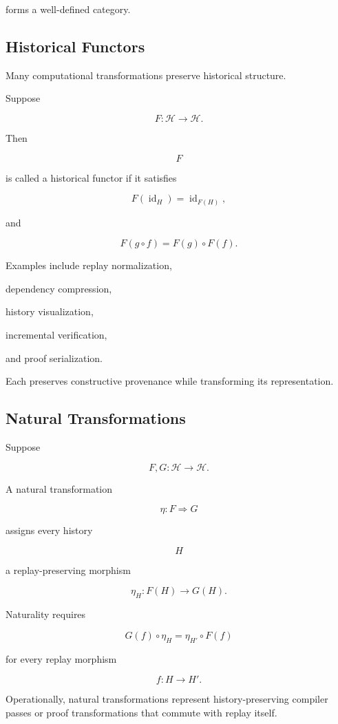 \documentclass[12pt,oneside]{article}
\theoremstyle{definition}
\theoremstyle{remark}
\begin{document}
forms a well-defined category.

\subsection{Historical Functors}

Many computational transformations preserve historical structure.

Suppose

\[
F:\mathcal H\rightarrow\mathcal H.
\]

Then

\[
F
\]

is called a historical functor if it satisfies

\[
F(\operatorname{id}_H)
=
\operatorname{id}_{F(H)},
\]

and

\[
F(g\circ f)
=
F(g)\circ F(f).
\]

Examples include replay normalization,

dependency compression,

history visualization,

incremental verification,

and proof serialization.

Each preserves constructive provenance while transforming its representation.

\subsection{Natural Transformations}

Suppose

\[
F,G
:
\mathcal H
\rightarrow
\mathcal H.
\]

A natural transformation

\[
\eta
:
F
\Rightarrow
G
\]

assigns every history

\[
H
\]

a replay-preserving morphism

\[
\eta_H
:
F(H)
\rightarrow
G(H).
\]

Naturality requires

\[
G(f)\circ\eta_H
=
\eta_{H'}
\circ
F(f)
\]

for every replay morphism

\[
f:H\rightarrow H'.
\]

Operationally, natural transformations represent history-preserving compiler
passes or proof transformations that commute with replay itself.
\end{document}
